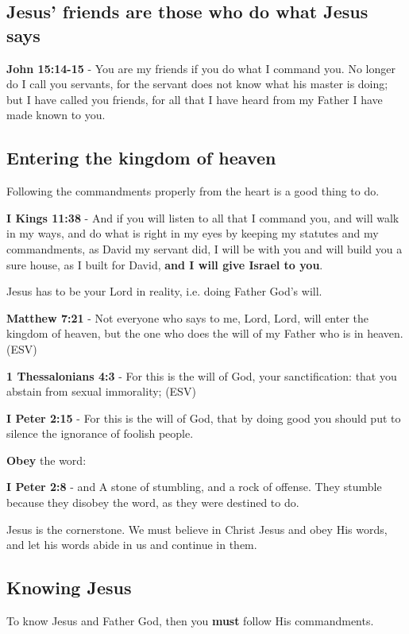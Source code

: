 \documentclass[11pt]{article}
\begin{document}
\subsection{Jesus' friends are those who do what Jesus says}
\label{sec:orgf813d29}
\textbf{John 15:14-15} - You are my friends if you do what I command you. No longer do I call you servants, for the servant does not know what his master is doing; but I have called you friends, for all that I have heard from my Father I have made known to you.

\subsection{Entering the kingdom of heaven}
\label{sec:org93c32eb}
Following the commandments properly from the heart is a good thing to do.

\textbf{I Kings 11:38} - And if you will listen to all that I command you, and will walk in my ways, and do what is right in my eyes by keeping my statutes and my commandments, as David my servant did, I will be with you and will build you a sure house, as I built for David, \textbf{and I will give Israel to you}.

Jesus has to be your Lord in reality, i.e. doing Father God's will.

\textbf{Matthew 7:21} - Not everyone who says to me, Lord, Lord, will enter the kingdom of heaven, but the one who does the will of my Father who is in heaven. (ESV)

\textbf{1 Thessalonians 4:3} - For this is the will of God, your sanctification: that you abstain from sexual immorality; (ESV)

\textbf{I Peter 2:15} - For this is the will of God, that by doing good you should put to silence the ignorance of foolish people.

\textbf{Obey} the word:

\textbf{I Peter 2:8} - and A stone of stumbling, and a rock of offense. They stumble because they disobey the word, as they were destined to do.

Jesus is the cornerstone. We must believe in Christ Jesus and obey His words, and let his words abide in us and continue in them.

\subsection{Knowing Jesus}
\label{sec:org2f8f2cf}
To know Jesus and Father God, then you \textbf{must} follow His commandments.
\end{document}
